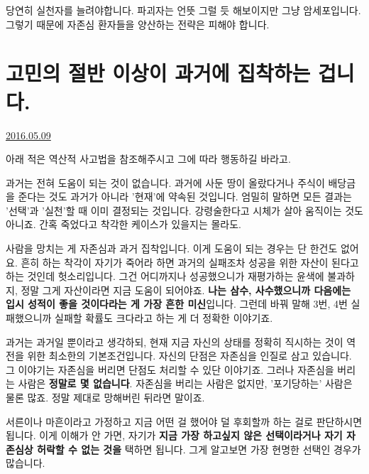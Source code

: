 당연히 실천자를 늘려야합니다. 파괴자는 언뜻 그럴 듯 해보이지만 그냥 암세포입니다.
그렇기 때문에 자존심 환자들을 양산하는 전략은 피해야 합니다.
\vspace{5mm}






\section{고민의 절반 이상이 과거에 집착하는 겁니다.}
\href{https://www.kockoc.com/Apoc/766840}{2016.05.09}

\vspace{5mm}

아래 적은 역산적 사고법을 참조해주시고 그에 따라 행동하길 바라고.
\vspace{5mm}

과거는 전혀 도움이 되는 것이 없습니다.
과거에 사둔 땅이 올랐다거나 주식이 배당금을 준다는 것도 과거가 아니라 '현재'에 약속된 것입니다.
엄밀히 말하면 모든 결과는 '선택'과 '실천'할 때 이미 결정되는 것입니다.
강령술한다고 시체가 살아 움직이는 것도 아니죠. 간혹 죽었다고 착각한 케이스가 있을지는 몰라도.
\vspace{5mm}

사람을 망치는 게 자존심과 과거 집착입니다. 이게 도움이 되는 경우는 단 한건도 없어요.
흔히 하는 착각이 자기가 죽어라 하면 과거의 실패조차 성공을 위한 자산이 된다고 하는 것인데 헛소리입니다.
그건 어디까지나 성공했으니가 재평가하는 윤색에 불과하지, 정말 그게 자산이라면 지금 도움이 되어야죠.
\textbf{나는 삼수, 사수했으니까 다음에는 입시 성적이 좋을 것이다라는 게 가장 흔한 미신}입니다.
그런데 바꿔 말해 3번, 4번 실패했으니까 실패할 확률도 크다라고 하는 게 더 정확한 이야기죠.
\vspace{5mm}

과거는 과거일 뿐이라고 생각하되, 현재 지금 자신의 상태를 정확히 직시하는 것이 역전을 위한 최소한의 기본조건입니다.
자신의 단점은 자존심을 인질로 삼고 있습니다. 그 이야기는 자존심을 버리면 단점도 처리할 수 있단 이야기죠.
그러나 자존심을 버리는 사람은 \textbf{정말로 몇 없습니다}.
자존심을 버리는 사람은 없지만, '포기당하는' 사람은 물론 많죠. 정말 제대로 망해버린 뒤라면 말이죠.
\vspace{5mm}

서른이나 마흔이라고 가정하고 지금 어떤 걸 했어야 덜 후회할까 하는 걸로 판단하시면 됩니다.
이게 이해가 안 가면, 자기가 \textbf{지금 가장 하고싶지 않은 선택이라거나 자기 자존심상 허락할 수 없는 것을} 택하면 됩니다.
그게 알고보면 가장 현명한 선택인 경우가 많습니다.
\vspace{5mm}



